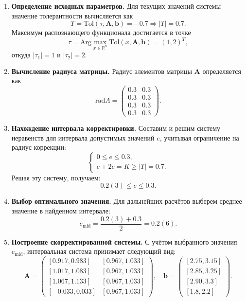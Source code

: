 \documentclass[a4paper,14pt]{article}
\begin{document}
    \begin{enumerate}
      \item \textbf{Определение исходных параметров.} Для текущих значений системы значение толерантности вычисляется как 
      \[
      T = \text{Tol}(\tau, \mathbf{A}, \mathbf{b}) = -0.7 \Rightarrow |T| = 0.7.
      \]
      Максимум распознающего функционала достигается в точке 
      \[
      \tau = \text{Arg} \max_{x \in \mathbb{R}^n} \text{Tol}(x, \mathbf{A}, \mathbf{b}) = (1, 2)^T,
      \]
      откуда \( |\tau_1| = 1 \) и \( |\tau_2| = 2 \).
      
      \item \textbf{Вычисление радиуса матрицы.} Радиус элементов матрицы \(\mathbf{A}\) определяется как 
      \[
      \text{rad} A = \begin{pmatrix}
          0.3 & 0.3 \\
          0.3 & 0.3 \\
          0.3 & 0.3 \\
          0.3 & 0.3
      \end{pmatrix}.
      \]
    
      \item \textbf{Нахождение интервала корректировки.} Составим и решим систему неравенств для интервала допустимых значений \( e \), учитывая ограничение на радиус коррекции:
      \[
      \begin{cases}
        0 \leqslant e \leqslant 0.3, \\
        e + 2e = K \geqslant |T| = 0.7.
      \end{cases}
      \]
      Решая эту систему, получаем:
      \[
      0.2(3) \leqslant e \leqslant 0.3.
      \]
    
      \item \textbf{Выбор оптимального значения.} Для дальнейших расчётов выберем среднее значение в найденном интервале:
      \[
      e_{\text{mid}} = \frac{0.2(3) + 0.3}{2} = 0.2(6).
      \]
    
      \item \textbf{Построение скорректированной системы.} С учётом выбранного значения \( e_{\text{mid}} \), интервальная система принимает следующий вид:
      \[
      \mathbf{A} = \begin{pmatrix}
          [0.917, 0.983] & [0.967, 1.033] \\
          [1.017, 1.083] & [0.967, 1.033] \\
          [1.067, 1.133] & [0.967, 1.033] \\
          [-0.033, 0.033] & [0.967, 1.033]
      \end{pmatrix}, \quad
      \mathbf{b} = \begin{pmatrix}
          [2.75, 3.15] \\
          [2.85, 3.25] \\
          [2.90, 3.3] \\
          [1.8, 2.2]
      \end{pmatrix}.
      \]
    \end{enumerate}
\end{document}
